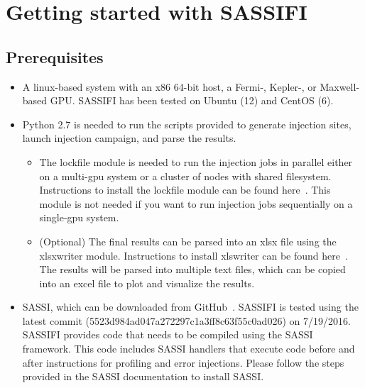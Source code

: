 \section{Getting started with SASSIFI}

\subsection{Prerequisites}

\begin{itemize}

\item A linux-based system with an x86 64-bit host, a Fermi-, Kepler-, or
Maxwell-based GPU. SASSIFI has been tested on Ubuntu (12) and CentOS (6).

\item Python 2.7 is needed to run the scripts provided to generate injection
sites, launch injection campaign, and parse the results.	

\begin{itemize}
\item The lockfile module is needed to run the injection jobs in parallel
either on a multi-gpu system or a cluster of nodes with shared filesystem. 
Instructions to install the lockfile module can be found here~\cite{lockfile}.
This module is not needed if you want to run injection jobs sequentially on a
single-gpu system. 
\item (Optional) The final results can be parsed into an xlsx file using the
xlsxwriter module. Instructions to install xlswriter can be found
here~\cite{XlsxWriter}. The results will be parsed into multiple text files,
which can be copied into an excel file to plot and visualize the results.
\end{itemize}

\item SASSI, which can be downloaded from GitHub~\cite{SASSI}. SASSIFI is
tested using the latest commit (5523d984ad047a272297c1a3ff8c63f55c0ad026) on
7/19/2016. SASSIFI provides code  that needs to be compiled using the SASSI
framework.  This code includes SASSI handlers that execute code before and
after instructions for profiling and error injections. Please follow the steps
provided in the SASSI documentation to install SASSI. 

\end{itemize}






